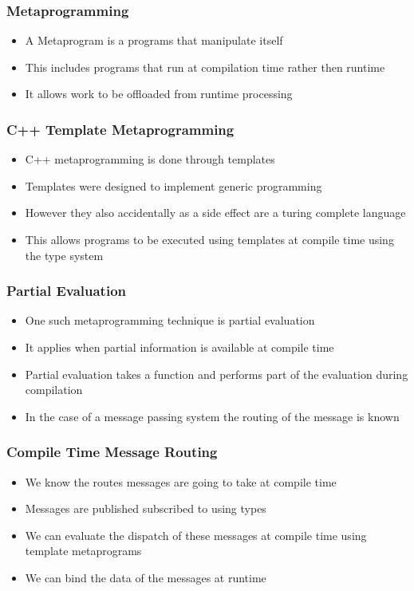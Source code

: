 \documentclass{beamer}
\begin{document}
	\begin{frame}
		\frametitle{Metaprogramming}
		\begin{itemize}
			\item A Metaprogram is a programs that manipulate itself
			\item This includes programs that run at compilation time rather then runtime
			\item It allows work to be offloaded from runtime processing
		\end{itemize}
	\end{frame}

	\begin{frame}
		\frametitle{C++ Template Metaprogramming}
		\begin{itemize}
			\item C++ metaprogramming is done through templates
			\item Templates were designed to implement generic programming
			\item However they also accidentally as a side effect are a turing complete language
			\item This allows programs to be executed using templates at compile time using the type system
		\end{itemize}
	\end{frame}

	\begin{frame}
		\frametitle{Partial Evaluation}
		\begin{itemize}
			\item One such metaprogramming technique is partial evaluation
			\item It applies when partial information is available at compile time
			\item Partial evaluation takes a function and performs part of the evaluation during compilation
			\item In the case of a message passing system the routing of the message is known
		\end{itemize}
	\end{frame}

	\begin{frame}
		\frametitle{Compile Time Message Routing}
		\begin{itemize}
			\item We know the routes messages are going to take at compile time
			\item Messages are published subscribed to using types
			\item We can evaluate the dispatch of these messages at compile time using template metaprograms
			\item We can bind the data of the messages at runtime
		\end{itemize}
	\end{frame}
\end{document}
